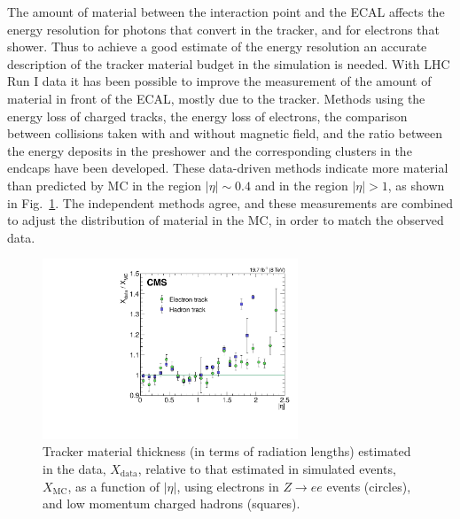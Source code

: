 \documentclass[journal]{IEEEtran}
\begin{document}
The amount of material between the interaction point and the ECAL affects the energy resolution for photons that convert in the tracker, and for electrons that shower. Thus to achieve a good estimate of the energy resolution an accurate description of the tracker material budget in the simulation is needed. 
With LHC Run I data it has been possible to improve the measurement of the amount of material in front of the ECAL, mostly due to the tracker. Methods using the energy loss of charged tracks, the energy loss of electrons, the comparison between collisions taken with and without magnetic field, and the ratio between the energy deposits in the preshower and the corresponding clusters in the endcaps have been developed. These data-driven methods indicate more material than predicted by MC in the region $\vert\eta\vert \sim 0.4$ and in the region $\vert\eta\vert>1$, as shown in Fig.~\ref{fig:material}. The independent methods agree, and these measurements are combined to adjust the distribution of material in the MC, in order to match the observed data.
%
\begin{figure}[!t]
  \begin{center}
    \includegraphics[width=3.0in]{material}
    \caption{Tracker material thickness (in terms of radiation lengths) estimated in the data, $X_\mathrm{data}$, relative to that estimated in simulated events, $X_\mathrm{MC}$, as a function of $\vert\eta\vert$, using electrons in $Z\to ee$ events (circles), and low momentum charged hadrons (squares). \label{fig:material}}
  \end{center}
\end{figure}
%
\end{document}
